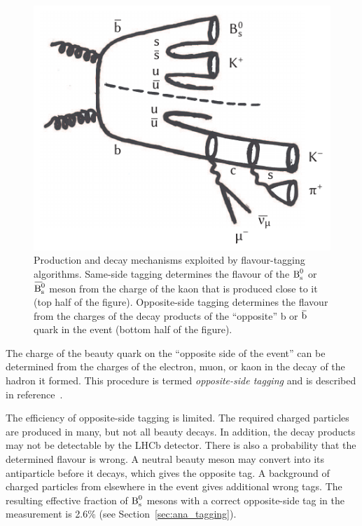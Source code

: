 \begin{figure}[tbh]
  \centering
  \includegraphics{graphics/intro/tikz/tagging}
  \caption{Production and decay mechanisms exploited by flavour-tagging algorithms.
           Same-side tagging determines the flavour of the $\text{B}_\text{s}^\text{0}$ or $\Bsbar$ meson from the charge of the kaon that is produced close to it
           (top half of the figure).
           Opposite-side tagging determines the flavour from the charges of the decay products of the ``opposite'' b or $\qbar[b]$ quark in
           the event
           (bottom half of the figure).}
  \label{fig:tagging}
\end{figure}

The charge of the beauty quark on the ``opposite side of the event'' can be determined from the charges of the electron, muon, or kaon in
the decay of the hadron it formed. This procedure is termed \emph{opposite-side tagging} and is described in
reference~\cite{LHCb-PAPER-2011-027}.

The efficiency of opposite-side tagging is limited. The required charged particles are produced in many, but not all beauty decays. In
addition, the decay products may not be detectable by the LHCb detector. There is also a probability that the determined flavour is wrong.
A neutral beauty meson may convert into its antiparticle before it decays, which gives the opposite tag. A background of charged particles
from elsewhere in the event gives additional wrong tags. The resulting effective fraction of $\text{B}_\text{s}^\text{0}$ mesons with a correct opposite-side tag
in the \BstoJpsiKK{} measurement is 2.6\% (see Section~\ref{sec:ana_tagging}).

